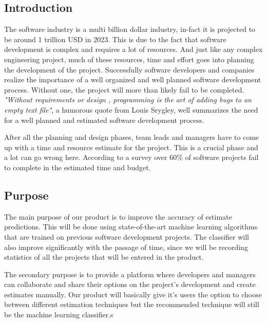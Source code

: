 \subsection{Introduction}
The software industry is a multi billion dollar industry, in-fact it is projected to be around 1 trillion USD in 2023. This is due to the fact that software development is complex and requires a lot of resources. And just like any complex engineering project, much of these resources, time and effort goes into planning the development of the project. Successfully software developers and companies realize the importance of a well organized and well planned software development process. Without one, the project will more than likely fail to be completed. {\it{"Without requirements or design , programming is the art of adding bugs to an empty text file"}}, a humorous quote from Louis Srygley, well summarizes the need for  a well planned and estimated software development process.

After all the planning and design phases, team leads and managers have to come up with a time and resource estimate for the project. This is a crucial phase and a lot can go wrong here. According to a survey over 60\% of software projects fail to complete in the estimated time and budget. 












\subsection{Purpose}
The main purpose of our product is to improve the accuracy of estimate predictions. This will be done using state-of-the-art machine learning algorithms that are trained on previous software development projects. The classifier will also improve significantly with the passage of time, since we will be recording statistics of all the projects that will be entered in the product. 

 The secondary purpose is to provide a platform where developers and managers can collaborate and share their options on the project's development and create estimates manually. Our product will basically give it's users the option to choose between different estimation techniques but the recommended technique will still be the machine learning classifier.s












